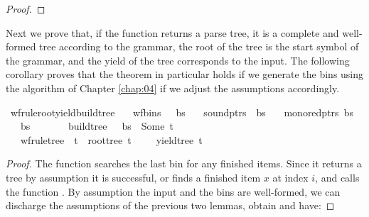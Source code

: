 \begin{isabellebody}
\begin{isamarkuptext}
\begin{proof}
\end{proof}%
\end{isamarkuptext}\isamarkuptrue%
%
\begin{isamarkuptext}%
Next we prove that, if the function  returns a parse tree, it is a complete and
well-formed tree according to the grammar, the root of the tree is the start symbol of the grammar,
and the yield of the tree corresponds to the input. The following corollary proves that the theorem
in particular holds if we generate the bins using the algorithm of Chapter \ref{chap:04} if we adjust
the assumptions accordingly.%
\end{isamarkuptext}\isamarkuptrue%
\isamarkupfalse%
\ wf{\isacharunderscore}{\kern0pt}rule{\isacharunderscore}{\kern0pt}root{\isacharunderscore}{\kern0pt}yield{\isacharunderscore}{\kern0pt}build{\isacharunderscore}{\kern0pt}tree{\isacharcolon}{\kern0pt}\isanewline
\ \ \ {\isachardoublequoteopen}wf{\isacharunderscore}{\kern0pt}bins\ {\isasymG}\ {\isasymomega}\ bs{\isachardoublequoteclose}\isanewline
\ \ \ {\isachardoublequoteopen}sound{\isacharunderscore}{\kern0pt}ptrs\ {\isasymomega}\ bs{\isachardoublequoteclose}\isanewline
\ \ \ {\isachardoublequoteopen}mono{\isacharunderscore}{\kern0pt}red{\isacharunderscore}{\kern0pt}ptrs\ bs{\isachardoublequoteclose}\isanewline
\ \ \ {\isachardoublequoteopen}{\isacharbar}{\kern0pt}bs{\isacharbar}{\kern0pt}\ {\isacharequal}{\kern0pt}\ {\isacharbar}{\kern0pt}{\isasymomega}{\isacharbar}{\kern0pt}\ {\isacharplus}{\kern0pt}\ {}{\isachardoublequoteclose}\isanewline
\ \ \ {\isachardoublequoteopen}build{\isacharunderscore}{\kern0pt}tree\ {\isasymG}\ {\isasymomega}\ bs\ {\isacharequal}{\kern0pt}\ Some\ t{\isachardoublequoteclose}\isanewline
\ \ \ {\isachardoublequoteopen}wf{\isacharunderscore}{\kern0pt}rule{\isacharunderscore}{\kern0pt}tree\ {\isasymG}\ t\ {\isasymand}\ root{\isacharunderscore}{\kern0pt}tree\ t\ {\isacharequal}{\kern0pt}\ {\isasymSS}\ {\isasymG}\ {\isasymand}\ yield{\isacharunderscore}{\kern0pt}tree\ t\ {\isacharequal}{\kern0pt}\ {\isasymomega}{\isachardoublequoteclose}%
\isadelimproof
%
\endisadelimproof
%
\isatagproof
%
\endisatagproof
{\isafoldproof}%
%
\isadelimproof
%
\endisadelimproof
%
\begin{isamarkuptext}%
\begin{proof}

The function  searches the last bin for any finished items. Since it returns
a tree by assumption it is successful, or finds a finished item $x$ at index $i$, and calls
the function . By assumption the input and the bins are
well-formed, we can discharge the assumptions of the previous two lemmas, obtain  and have:


\end{proof}
\end{isamarkuptext}
\end{isabellebody}
